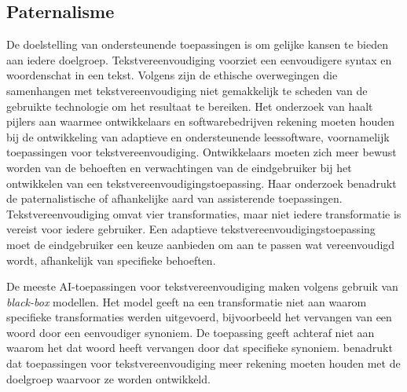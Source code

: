 



\subsection{Paternalisme}

De doelstelling van ondersteunende toepassingen is om gelijke kansen te bieden aan iedere doelgroep. Tekstvereenvoudiging voorziet een eenvoudigere syntax en woordenschat in een tekst. Volgens \textcite{Niemeijer2010} zijn de ethische overwegingen die samenhangen met tekstvereenvoudiging niet gemakkelijk te scheden van de gebruikte technologie om het resultaat te bereiken. Het onderzoek van \textcite{Gooding2022} haalt pijlers aan waarmee ontwikkelaars en softwarebedrijven rekening moeten houden bij de ontwikkeling van adaptieve en ondersteunende leessoftware, voornamelijk toepassingen voor tekstvereenvoudiging. Ontwikkelaars moeten zich meer bewust worden van de behoeften en verwachtingen van de eindgebruiker bij het ontwikkelen van een tekstvereenvoudigingstoepassing. Haar onderzoek benadrukt de paternalistische of afhankelijke aard van assisterende toepassingen. Tekstvereenvoudiging omvat vier transformaties, maar niet iedere transformatie is vereist voor iedere gebruiker. Een adaptieve tekstvereenvoudigingstoepassing moet de eindgebruiker een keuze aanbieden om aan te passen wat vereenvoudigd wordt, afhankelijk van specifieke behoeften.


De meeste AI-toepassingen voor tekstvereenvoudiging maken volgens \textcite{Punardeep2020} gebruik van \textit{black-box} modellen. Het model geeft na een transformatie niet aan waarom specifieke transformaties werden uitgevoerd, bijvoorbeeld het vervangen van een woord door een eenvoudiger synoniem. De toepassing geeft achteraf niet aan waarom het dat woord heeft vervangen door dat specifieke synoniem. \textcite{Xu2015} benadrukt dat toepassingen voor tekstvereenvoudiging meer rekening moeten houden met de doelgroep waarvoor ze worden ontwikkeld. 


